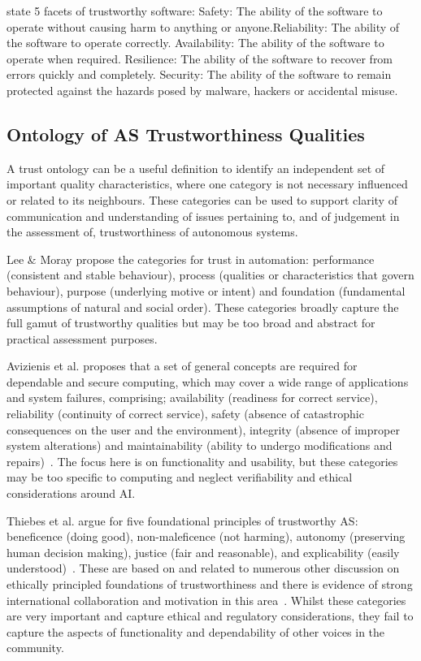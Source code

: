 \cite{ts_foundation} state 5 facets of trustworthy software: Safety: The ability of the software to operate without causing harm to anything or anyone.Reliability: The ability of the software to operate correctly. Availability: The ability of the software to operate when required.
Resilience: The ability of the software to recover from errors quickly and completely. Security: The ability of the software to remain protected against the hazards posed by malware, hackers or accidental misuse.



\subsection{Ontology of AS Trustworthiness Qualities}\label{sec:tasq-ont}

A trust ontology can be a useful definition to identify an independent set of important quality characteristics, where one category is not necessary influenced or related to its neighbours. These categories can be used to support clarity of communication and understanding of issues pertaining to, and of judgement in the assessment of, trustworthiness of autonomous systems. 

Lee \& Moray propose the categories for trust in automation: performance (consistent and stable behaviour), process (qualities or characteristics that govern behaviour), purpose (underlying motive or intent) and foundation (fundamental assumptions of natural and social order). These categories broadly capture the full gamut of trustworthy qualities but may be too broad and abstract for practical assessment purposes. 

Avizienis et al. proposes that a set of general concepts are required for dependable and secure computing, which may cover a wide range of applications and system failures, comprising; availability (readiness for correct service), reliability (continuity of correct service), safety (absence of catastrophic consequences on the user and the environment), integrity (absence of improper system alterations) and maintainability (ability to undergo modifications and repairs)~\cite{avizienis2004basic}. The focus here is on functionality and usability, but these categories may be too specific to computing and neglect verifiability and ethical considerations around AI.

Thiebes et al. argue for five foundational principles of trustworthy AS: beneficence (doing good), non-maleficence (not harming), autonomy (preserving human decision making), justice (fair and reasonable), and explicability (easily understood)~\cite{Thiebes2021}. These are based on and related to numerous other discussion on ethically principled foundations of trustworthiness and there is evidence of strong international collaboration and motivation in this area~\cite{Floridi2018,jobin2019global}. Whilst these categories are very important and capture ethical and regulatory considerations, they fail to capture the aspects of functionality and dependability of other voices in the community.

